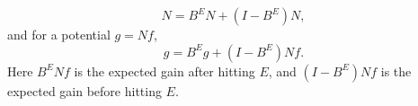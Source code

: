 $$N = B^E N + (I - B^E)N,$$
and for a potential $g = Nf$,
$$g = B^E g + (I - B^E)Nf.$$
Here $B^E N f$ is the expected gain after hitting $E$, and $(I - B^E)Nf$ is the expected gain before hitting $E$.
